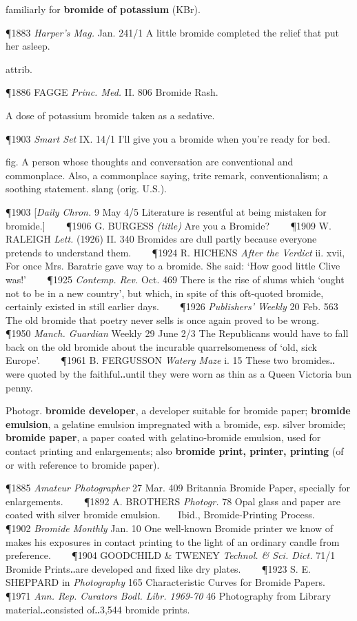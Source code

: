 \begin{description}[wide, labelwidth=!, labelindent=0pt]
\begin{myenumerate}
 familiarly for \textbf{bromide of potassium} (KBr).

\P 1883 \textit{Harper's  Mag.} Jan. 241/1 A little bromide completed the relief that put her asleep.

 attrib.

\P 1886 FAGGE  \textit{Princ. Med.} II. 806 Bromide Rash.

 A dose of potassium bromide taken as a sedative.

\P 1903 \textit{Smart  Set} IX. 14/1 I'll give you a bromide when you're ready for bed.

 fig. A person whose thoughts and conversation are conventional and commonplace. Also, a commonplace saying, trite remark, conventionalism; a soothing statement. slang (orig. U.S.).

\P 1903 [\textit{Daily  Chron.} 9 May 4/5 Literature is resentful at being mistaken for bromide.]    
\P 1906 G. BURGESS  \textit{(title)} Are you a Bromide?    
\P 1909 W. RALEIGH  \textit{Lett.} (1926) II. 340 Bromides are dull partly because everyone pretends to understand them.    
\P 1924 R. HICHENS  \textit{After the Verdict} ii. xvii, For once Mrs. Baratrie gave way to a bromide. She said: ‘How good little Clive was!’    
\P 1925 \textit{Contemp.  Rev.} Oct. 469 There is the rise of slums which ‘ought not to be in a new country’, but which, in spite of this oft-quoted bromide, certainly existed in still earlier days.    
\P 1926 \textit{Publishers' Weekly} 20 Feb. 563 The old bromide that poetry never sells is once again proved to be wrong.    
\P 1950 \textit{Manch.  Guardian} Weekly 29 June 2/3 The Republicans would have to fall back on the old bromide about the incurable quarrelsomeness of ‘old, sick Europe’.    
\P 1961 B. FERGUSSON  \textit{Watery Maze} i. 15 These two bromides‥were quoted by the faithful‥until they were worn as thin as a Queen Victoria bun penny.

 Photogr.  \textbf{bromide developer}, a developer suitable for bromide paper; 
\textbf{bromide emulsion}, a gelatine emulsion impregnated with a bromide, esp. silver bromide; 
\textbf{bromide paper}, a paper coated with gelatino-bromide emulsion, used for contact printing and enlargements; 
also \textbf{bromide print, printer, printing} (of or with reference to bromide paper).

\P 1885 \textit{Amateur  Photographer} 27 Mar. 409 Britannia Bromide Paper, specially for enlargements.    
\P 1892 A. BROTHERS  \textit{Photogr.} 78 Opal glass and paper are coated with silver bromide emulsion.    Ibid., Bromide-Printing Process.    
\P 1902 \textit{Bromide  Monthly} Jan. 10 One well-known Bromide printer we know of makes his exposures in contact printing to the light of an ordinary candle from preference.    
\P 1904 GOODCHILD  \& TWENEY \textit{Technol. \& Sci. Dict.} 71/1 Bromide Prints‥are developed and fixed like dry plates.    
\P 1923 S. E. SHEPPARD in \textit{Photography} 165 Characteristic Curves for Bromide Papers.    
\P 1971 \textit{Ann. Rep. Curators Bodl. Libr. 1969-70} 46 Photography from Library material‥consisted of‥3,544 bromide prints.


\end{myenumerate}
\end{description}
